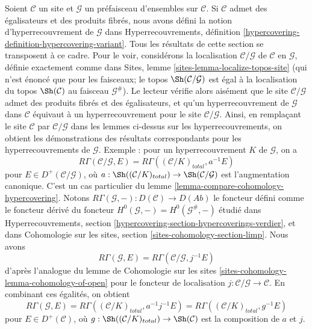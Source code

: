 \begin{remark}
\label{remark-compare-cohomology-hypercovering-presheaf}
Soient $\mathcal{C}$ un site et $\mathcal{G}$ un préfaisceau d'ensembles sur
$\mathcal{C}$. Si $\mathcal{C}$ admet des égalisateurs et des produits fibrés,
nous avons défini la notion d'hyperrecouvrement de $\mathcal{G}$ dans
Hyperrecouvrements, définition \ref{hypercovering-definition-hypercovering-variant}.
Tous les résultats de cette section se transposent à
ce cadre.
Pour le voir,
considérons la localisation $\mathcal{C}/\mathcal{G}$
de $\mathcal{C}$ en $\mathcal{G}$, définie exactement comme dans
Sites, lemme \ref{sites-lemma-localize-topos-site}
(qui n'est énoncé que pour les faisceaux; le topos
$\Sh(\mathcal{C}/\mathcal{G})$ est égal à la localisation
du topos $\Sh(\mathcal{C})$ au faisceau $\mathcal{G}^\#$).
Le lecteur vérifie alors aisément que le site
$\mathcal{C}/\mathcal{G}$ admet des produits fibrés et des égalisateurs,
et qu'un hyperrecouvrement de $\mathcal{G}$ dans $\mathcal{C}$
équivaut à un hyperrecouvrement pour le site $\mathcal{C}/\mathcal{G}$.
Ainsi, en remplaçant le site $\mathcal{C}$ par $\mathcal{C}/\mathcal{G}$
dans les lemmes ci-dessus sur les hyperrecouvrements, on obtient les démonstrations des
résultats correspondants pour les hyperrecouvrements de $\mathcal{G}$.
Exemple : pour un hyperrecouvrement $K$ de $\mathcal{G}$, on a
$$
R\Gamma(\mathcal{C}/\mathcal{G}, E) =
R\Gamma((\mathcal{C}/K)_{total}, a^{-1}E)
$$
pour $E \in D^+(\mathcal{C}/\mathcal{G})$, où
$a : \Sh((\mathcal{C}/K)_{total}) \to \Sh(\mathcal{C}/\mathcal{G})$
est l'augmentation canonique. C'est un cas particulier du lemme
\ref{lemma-compare-cohomology-hypercovering}.
Notons $R\Gamma(\mathcal{G}, -) : D(\mathcal{C}) \to D(\textit{Ab})$ le foncteur
défini comme le foncteur dérivé du foncteur
$H^0(\mathcal{G}, -) = H^0(\mathcal{G}^\#, -)$
étudié dans Hyperrecouvrements, section
\ref{hypercovering-section-hypercoverings-verdier}, et dans
Cohomologie sur les sites, section \ref{sites-cohomology-section-limp}.
Nous avons
$$
R\Gamma(\mathcal{G}, E) = R\Gamma(\mathcal{C}/\mathcal{G}, j^{-1}E)
$$
d'après l'analogue du lemme de Cohomologie sur les sites
\ref{sites-cohomology-lemma-cohomology-of-open}
pour le foncteur de localisation $j : \mathcal{C}/\mathcal{G} \to \mathcal{C}$.
En combinant ces égalités, on obtient
$$
R\Gamma(\mathcal{G}, E) =
R\Gamma((\mathcal{C}/K)_{total}, a^{-1}j^{-1}E) =
R\Gamma((\mathcal{C}/K)_{total}, g^{-1}E)
$$
pour $E \in D^+(\mathcal{C})$, où
$g : \Sh((\mathcal{C}/K)_{total}) \to \Sh(\mathcal{C})$
est la composition de $a$ et $j$.
\end{remark}







